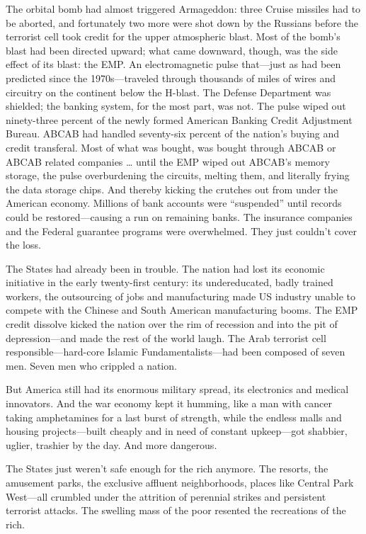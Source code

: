 The orbital bomb had almost triggered Armageddon: three Cruise missiles had to be aborted, and fortunately two more were shot down by the Russians before the terrorist cell took credit for the upper atmospheric blast. Most of the bomb’s blast had been directed upward; what came downward, though, was the side effect of its blast: the EMP. An electromagnetic pulse that—just as had been predicted since the 1970s—traveled through thousands of miles of wires and circuitry on the continent below the H-blast. The Defense Department was shielded; the banking system, for the most part, was not. The pulse wiped out ninety-three percent of the newly formed American Banking Credit Adjustment Bureau. ABCAB had handled seventy-six percent of the nation’s buying and credit transferal. Most of what was bought, was bought through ABCAB or ABCAB related companies … until the EMP wiped out ABCAB’s memory storage, the pulse overburdening the circuits, melting them, and literally frying the data storage chips. And thereby kicking the crutches out from under the American economy. Millions of bank accounts were “suspended” until records could be restored—causing a run on remaining banks. The insurance companies and the Federal guarantee programs were overwhelmed. They just couldn’t cover the loss.

The States had already been in trouble. The nation had lost its economic initiative in the early twenty-first century: its undereducated, badly trained workers, the outsourcing of jobs and manufacturing made US industry unable to compete with the Chinese and South American manufacturing booms. The EMP credit dissolve kicked the nation over the rim of recession and into the pit of depression—and made the rest of the world laugh. The Arab terrorist cell responsible—hard-core Islamic Fundamentalists—had been composed of seven men. Seven men who crippled a nation.

But America still had its enormous military spread, its electronics and medical innovators. And the war economy kept it humming, like a man with cancer taking amphetamines for a last burst of strength, while the endless malls and housing projects—built cheaply and in need of constant upkeep—got shabbier, uglier, trashier by the day. And more dangerous.

The States just weren’t safe enough for the rich anymore. The resorts, the amusement parks, the exclusive affluent neighborhoods, places like Central Park West—all crumbled under the attrition of perennial strikes and persistent terrorist attacks. The swelling mass of the poor resented the recreations of the rich.

